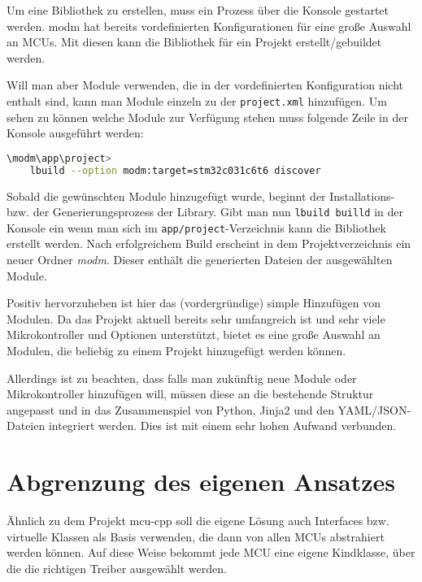 Um eine Bibliothek zu erstellen, muss ein Prozess über die Konsole gestartet werden.
modm hat bereits vordefinierten Konfigurationen für eine große Auswahl an MCUs.
Mit diesen kann die Bibliothek für ein Projekt erstellt/gebuildet werden.

Will man aber Module verwenden, die in der vordefinierten Konfiguration nicht enthalt sind, kann man Module einzeln zu der \texttt{project.xml} hinzufügen.
Um sehen zu können welche Module zur Verfügung stehen muss folgende Zeile in der Konsole ausgeführt werden:

\vspace{3mm}
\begin{lstlisting}[language=bash, caption={Konsolenbefehl um verf\"ugbare Module aufgelistet zu bekommen; hier f\"ur den STM32C031C6T6 Mikrokontroller.}, label={lst:modm_lbild_discover}]
\modm\app\project>
	lbuild --option modm:target=stm32c031c6t6 discover
\end{lstlisting}

Sobald die gewünschten Module hinzugefügt wurde, beginnt der Installations- bzw. der Generierungsprozess der Library. 
Gibt man nun \texttt{lbuild builld} in der Konsole ein wenn man sich im \texttt{app/project}-Verzeichnis kann die Bibliothek erstellt werden.
Nach erfolgreichem Build erscheint in dem Projektverzeichnis ein neuer Ordner \emph{modm}.
Dieser enthält die generierten Dateien der ausgewählten Module.

Positiv hervorzuheben ist hier das (vordergründige) simple Hinzufügen von Modulen.
Da das Projekt aktuell bereits sehr umfangreich ist und sehr viele Mikrokontroller und Optionen unterstützt, bietet es eine große Auswahl an Modulen, die beliebig zu einem Projekt hinzugefügt werden können.

Allerdings ist zu beachten, dass falls man zukünftig neue Module oder Mikrokontroller hinzufügen will, müssen diese an die bestehende Struktur angepasst und in das Zusammenspiel von Python, Jinja2 und den YAML/JSON-Dateien integriert werden.
Dies ist mit einem sehr hohen Aufwand verbunden.



\section{Abgrenzung des eigenen Ansatzes}
Ähnlich zu dem Projekt mcu-cpp soll die eigene Lösung auch Interfaces bzw. virtuelle Klassen als Basis verwenden, die dann von allen MCUs abstrahiert werden können.
Auf diese Weise bekommt jede MCU eine eigene Kindklasse, über die die richtigen Treiber ausgewählt werden.



